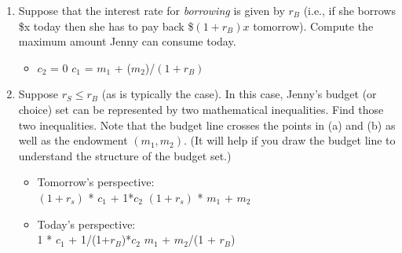 \documentclass[11pt]{article}
\begin{document}
\begin{enumerate}
\begin{enumerate}
        \item Suppose that the interest rate for \emph{borrowing} is given by $r_{B}$ (i.e., if she borrows \$x today then she has to pay back \$$(1+r_{B})x$ tomorrow). Compute the maximum amount Jenny can consume today.
        \begin{itemize}
            \item $c_{2}$ = 0 \hspace{1cm} \Rightarrow \hspace{1cm} $c_{1}$ = $m_{1}$ + ($m_{2}$)/$(1 + r_{B})$
        \end{itemize}

        \item Suppose $r_{S}\leq r_{B}$ (as is typically the case). In this case, Jenny's budget (or choice) set can be represented by two mathematical inequalities. Find those two inequalities. Note that the budget line crosses the points in (a) and (b) as well as the endowment $(m_{1},m_{2})$. (It will help if you draw the budget line to understand the structure of the budget set.)
        \begin{itemize}
            \item Tomorrow’s perspective:\\
            $(1 + r_{s})$ * $c_{1}$ + 1*$c_{2}$ \hspace{1cm} \leq \hspace{1cm} $(1 + r_{s})$ * $m_{1}$ + $m_{2}$
            \item Today’s perspective: \\
            1 * $c_{1}$ + 1/(1+$r_{B}$)*$c_{2}$ \hspace{0.8cm} \leq \hspace{1cm} $m_{1}$ + $m_{2}$/(1 + $r_{B}$)
        \end{itemize}
    \end{enumerate}


\end{enumerate}
\end{document}
